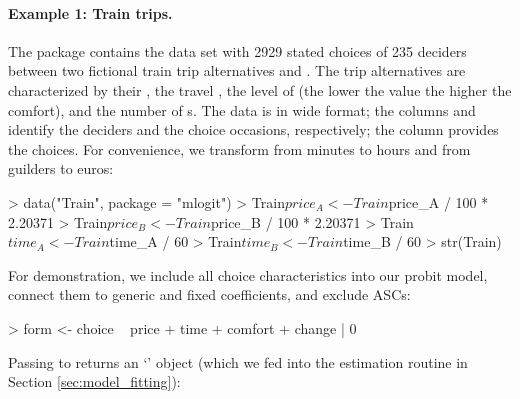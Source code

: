 \documentclass[article,shortnames]{jss}
\newcommand{\class}[1]{`\code{#1}'}
\newcommand{\fct}[1]{\code{#1()}}
\begin{document}
\paragraph{Example 1: Train trips.}

The  package contains the data set  with 2929 stated choices of 235 deciders between two fictional train trip alternatives  and . The trip alternatives are characterized by their , the travel , the level of  (the lower the value the higher the comfort), and the number of s. The data is in wide format; the columns  and  identify the deciders and the choice occasions, respectively; the column  provides the choices. For convenience, we transform  from minutes to hours and  from guilders to euros:

\begin{Schunk}
\begin{Sinput}
> data("Train", package = "mlogit")
> Train$price_A <- Train$price_A / 100 * 2.20371
> Train$price_B <- Train$price_B / 100 * 2.20371
> Train$time_A <- Train$time_A / 60
> Train$time_B <- Train$time_B / 60
> str(Train)
\end{Sinput}
\end{Schunk}

For demonstration, we include all choice characteristics into our probit model, connect them to generic and fixed coefficients, and exclude ASCs:

\begin{Schunk}
\begin{Sinput}
> form <- choice ~ price + time + comfort + change | 0
\end{Sinput}
\end{Schunk}

Passing  to \fct{prepare\_data} returns an \class{RprobitB\_data} object (which we fed into the estimation routine \fct{fit\_model} in Section \ref{sec:model_fitting}):
\end{document}
